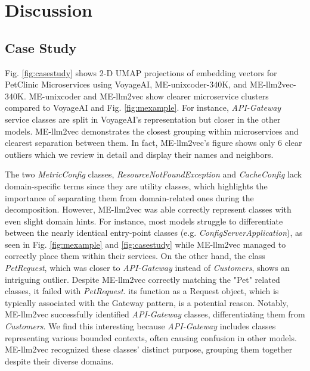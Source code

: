\section{Discussion}
\subsection{Case Study}


Fig. \ref{fig:casestudy} shows 2-D UMAP \cite{mcinnes2020umapuniformmanifoldapproximation} projections of embedding vectors for PetClinic Microservices \cite{microapps2024petclinic} using VoyageAI, ME-unixcoder-340K, and ME-llm2vec-340K. ME-unixcoder and ME-llm2vec show clearer microservice clusters compared to VoyageAI and Fig. \ref{fig:mexample}. For instance, \textit{API-Gateway} service classes are split in VoyageAI's representation but closer in the other models. ME-llm2vec demonstrates the closest grouping within microservices and clearest separation between them. In fact, ME-llm2vec's figure shows only 6 clear outliers which we review in detail and display their names and neighbors.



The two \textit{MetricConfig} classes, \textit{ResourceNotFoundException} and \textit{CacheConfig} lack domain-specific terms since they are utility classes, which highlights the importance of separating them from domain-related ones during the decomposition. However, ME-llm2vec was able correctly represent classes with even slight domain hints. For instance, most models struggle to differentiate between the nearly identical entry-point classes (e.g. \textit{ConfigServerApplication}), as seen in Fig. \ref{fig:mexample} and \ref{fig:casestudy} while ME-llm2vec managed to correctly place them within their services. On the other hand, the class \textit{PetRequest}, which was closer to \textit{API-Gateway} instead of \textit{Customers}, shows an intriguing outlier. Despite ME-llm2vec correctly matching the "Pet" related classes, it failed with \textit{PetRequest}. its function as a Request object, which is typically associated with the Gateway pattern, is a potential reason. Notably, ME-llm2vec successfully identified \textit{API-Gateway} classes, differentiating them from \textit{Customers}. We find this interesting because \textit{API-Gateway} includes classes representing various bounded contexts, often causing confusion in other models. ME-llm2vec recognized these classes' distinct purpose, grouping them together despite their diverse domains.


